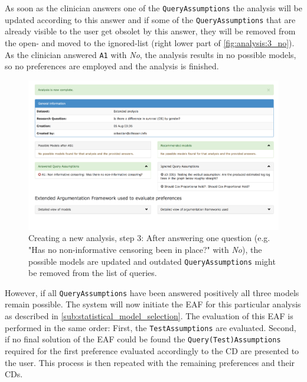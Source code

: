 As soon as the clinician answers one of the \texttt{QueryAssumptions} the analysis will be updated according to this answer and if some of the \texttt{QueryAssumptions} that are already visible to the user get obsolet by this answer, they will be removed from the open- and moved to the ignored-list (right lower part of \autoref{fig:analysis:3_no}). 
As the clinician answered \texttt{A1} with \textit{No}, the analysis results in no possible models, so no preferences are employed and the analysis is finished.

\begin{figure}[t]
	\centering
	\includegraphics[width=\textwidth]{figures/ui_analysis_2_no}
	\caption{Creating a new analysis, step 3: After answering one question (e.g. "Has no non-informative censoring been in place?" with \textit{No}), the possible models are updated and outdated \texttt{QueryAssumptions} might be removed from the list of queries.}
	\label{fig:analysis:3_no}
\end{figure}

However, if all \texttt{QueryAssumptions} have been answered positively all three models remain possible. The system will now initiate the \gls{EAF} for this particular analysis as described in \autoref{sub:statistical_model_selection}. The evaluation of this \gls{EAF} is performed in the same order: First, the \texttt{TestAssumptions} are evaluated. Second, if no final solution of the \gls{EAF} could be found the \texttt{Query(Test)Assumptions} required for the first preference evaluated accordingly to the \gls{CD} are presented to the user. This process is then repeated with the remaining preferences and their \glspl{CD}.

